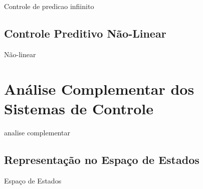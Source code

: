 Controle de predicao infiinito

\subsection{Controle Preditivo Não-Linear}

Não-linear

\section{Análise Complementar dos Sistemas de Controle}

analise complementar

\subsection{Representação no Espaço de Estados}

Espaço de Estados